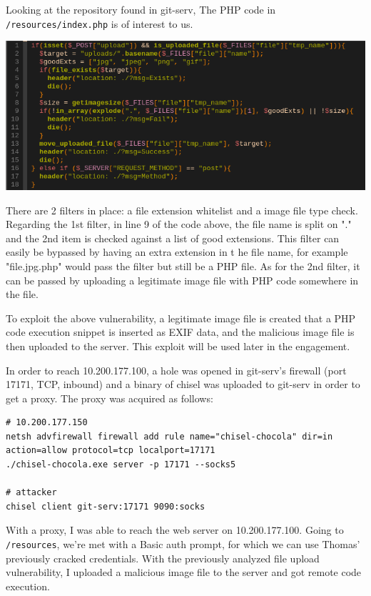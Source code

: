 Looking at the repository found in git-serv, The PHP code in \lstinline{/resources/index.php} is of interest to us.

\includegraphics[width=\textwidth]{img/vuln-code.png}

There are 2 filters in place: a file extension whitelist and a image file type check. Regarding the 1st filter, in line 9 of the code above, the file name is split on "." and the 2nd item is checked against  a list of good extensions. This filter can easily be bypassed by having an extra extension in t he file name, for example "file.jpg.php" would pass the filter but still be a PHP file. As for the 2nd filter, it can be passed by uploading a legitimate image file with PHP code somewhere in the file.

To exploit the above vulnerability, a legitimate image file is created that a PHP code execution snippet is inserted as EXIF data, and the malicious image file is then uploaded to the server. This exploit will be used later in the engagement.

In order to reach 10.200.177.100, a hole was opened in git-serv's firewall (port 17171, TCP, inbound) and a binary of chisel was uploaded to git-serv in order to get a proxy. The proxy was acquired as follows:

\begin{lstlisting}
# 10.200.177.150
netsh advfirewall firewall add rule name="chisel-chocola" dir=in action=allow protocol=tcp localport=17171
./chisel-chocola.exe server -p 17171 --socks5

# attacker
chisel client git-serv:17171 9090:socks
\end{lstlisting}

With a proxy, I was able to reach the web server on 10.200.177.100. Going to \lstinline{/resources}, we're met with a Basic auth prompt, for which we can use Thomas' previously cracked credentials. With the previously analyzed file upload vulnerability, I uploaded a malicious image file to the server and got remote code execution.

